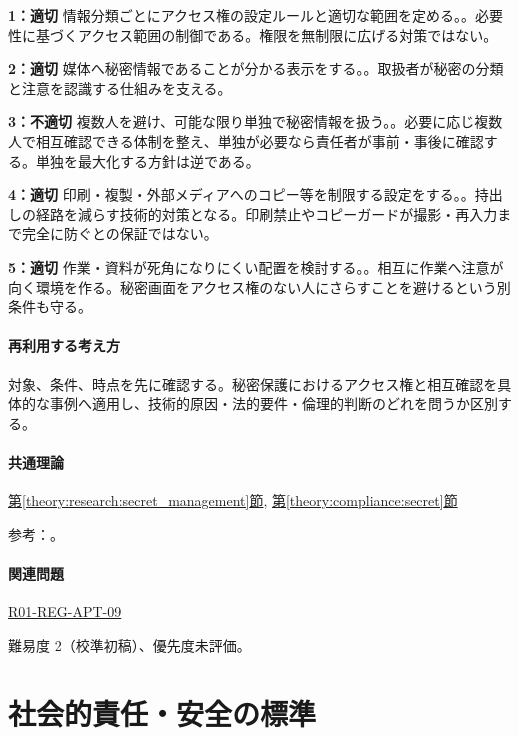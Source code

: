 \noindent\textbf{1：適切} 情報分類ごとにアクセス権の設定ルールと適切な範囲を定める。。必要性に基づくアクセス範囲の制御である。権限を無制限に広げる対策ではない。\par

\noindent\textbf{2：適切} 媒体へ秘密情報であることが分かる表示をする。。取扱者が秘密の分類と注意を認識する仕組みを支える。\par

\noindent\textbf{3：不適切} 複数人を避け、可能な限り単独で秘密情報を扱う。。必要に応じ複数人で相互確認できる体制を整え、単独が必要なら責任者が事前・事後に確認する。単独を最大化する方針は逆である。\par

\noindent\textbf{4：適切} 印刷・複製・外部メディアへのコピー等を制限する設定をする。。持出しの経路を減らす技術的対策となる。印刷禁止やコピーガードが撮影・再入力まで完全に防ぐとの保証ではない。\par

\noindent\textbf{5：適切} 作業・資料が死角になりにくい配置を検討する。。相互に作業へ注意が向く環境を作る。秘密画面をアクセス権のない人にさらすことを避けるという別条件も守る。\par

\paragraph{再利用する考え方} 対象、条件、時点を先に確認する。秘密保護におけるアクセス権と相互確認を具体的な事例へ適用し、技術的原因・法的要件・倫理的判断のどれを問うか区別する。

\paragraph{共通理論} \hyperref[theory:research:secret_management]{第\ref*{theory:research:secret_management}節}, \hyperref[theory:compliance:secret]{第\ref*{theory:compliance:secret}節}

\par 参考：\cite{meti_secret_handbook2024}。

\paragraph{関連問題} \hyperref[q:r01-reg-apt-09]{R01-REG-APT-09}

\par 難易度 2（校準初稿）、優先度未評価。

\section{社会的責任・安全の標準}

